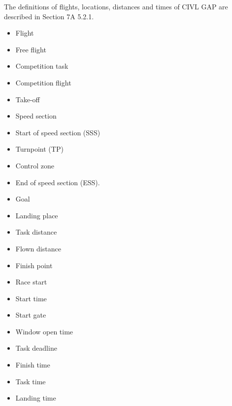 \documentclass[gap.tex]{subfiles}
\begin{document}
The definitions of flights, locations, distances and times of CIVL GAP are
described in Section 7A 5.2.1.
\begin{itemize}
    \item Flight
    \item Free flight
    \item Competition task
    \item Competition flight
    \item Take-off
    \item Speed section
    \item Start of speed section (SSS)
    \item Turnpoint (TP)
    \item Control zone
    \item End of speed section (ESS).
    \item Goal
    \item Landing place
    \item Task distance
    \item Flown distance
    \item Finish point
    \item Race start
    \item Start time
    \item Start gate
    \item Window open time
    \item Task deadline
    \item Finish time
    \item Task time
    \item Landing time
\end{itemize}
\end{document}

